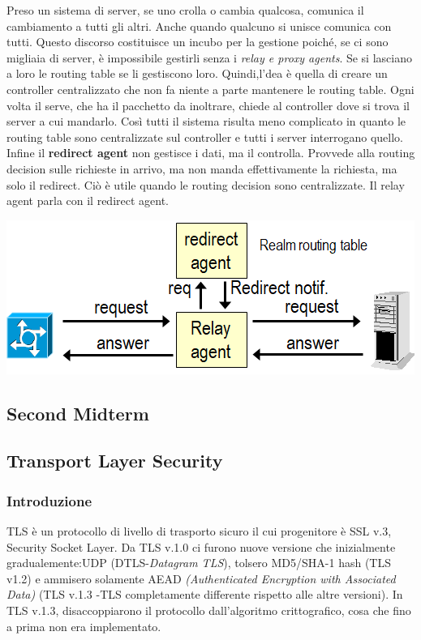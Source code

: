 \documentclass{book}
\theoremstyle{remark}
\begin{document}
Preso un sistema di server, se uno crolla o cambia qualcosa, comunica il cambiamento a tutti gli altri\@. Anche quando qualcuno si unisce comunica con tutti\@. Questo discorso costituisce un incubo per la gestione poiché, se ci sono migliaia di server, è impossibile gestirli senza i \emph{relay e proxy agents}\@. Se si lasciano a loro le routing table se li gestiscono loro\@.\newline
Quindi,l'dea è quella di creare un controller centralizzato che non fa niente a parte mantenere le routing table\@. Ogni volta il serve, che ha il pacchetto da inoltrare, chiede al controller dove si trova il server a cui mandarlo\@. Così tutti il sistema risulta meno complicato in quanto le routing table sono centralizzate sul controller e tutti i server interrogano quello\@.\newpage
Infine il \textbf{redirect agent} non gestisce i dati, ma il controlla\@. Provvede alla routing decision sulle richieste in arrivo, ma non manda effettivamente la richiesta, ma solo il redirect\@. Ciò è utile quando le routing decision sono centralizzate\@. Il relay agent parla con il redirect agent\@.
\begin{center}
	\includegraphics[scale=0.5]{redirectAgent.png}
\end{center}\newpage
\begin{center}
	\part{Second Midterm}
\end{center}
\chapter{Transport Layer Security}
\section{Introduzione}
TLS è un protocollo di livello di trasporto sicuro il cui progenitore è SSL v.3, Security Socket Layer\@. Da TLS v.1.0 ci furono nuove versione che inizialmente gradualemente:\@supportarono UDP (DTLS-\emph{Datagram TLS}), tolsero MD5/SHA-1 hash (TLS v1.2) e ammisero solamente AEAD\emph{ (Authenticated Encryption with Associated Data)}  (TLS v.1.3 -TLS completamente differente rispetto alle altre versioni)\@.
In TLS v.1.3, disaccoppiarono il protocollo dall'algoritmo crittografico, cosa che fino a prima non era implementato\@.
\end{document}
